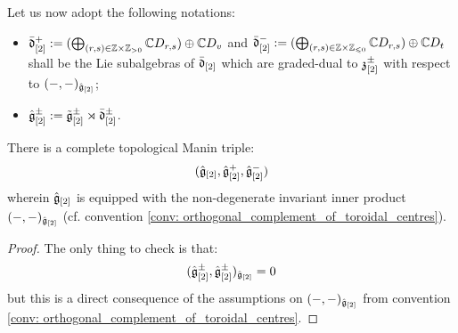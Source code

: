             \begin{convention}
                Let us now adopt the following notations:
                \begin{itemize}
                    \item $\bar{\d}_{[2]}^+ := ( \bigoplus_{(r, s) \in \Z \x \Z_{> 0} } \bbC D_{r, s} ) \oplus \bbC D_v$ and $\bar{\d}_{[2]}^- := ( \bigoplus_{(r, s) \in \Z \x \Z_{\leq 0} } \bbC D_{r, s} ) \oplus \bbC D_t$ shall be the Lie subalgebras of $\bar{\mathfrak{d}}_{[2]}$ which are graded-dual to $\mathfrak{z}_{[2]}^{\pm}$ with respect to $(-, -)_{\hat{\mathfrak{g}}_{[2]}}$;
                    \item $\hat{\mathfrak{g}}_{[2]}^{\pm} := \tilde{\mathfrak{g}}_{[2]}^{\pm} \rtimes \bar{\mathfrak{d}}_{[2]}^{\pm}$.
                \end{itemize}
            \end{convention}    
            \begin{theorem} \label{theorem: extended_toroidal_manin_triples}
                There is a complete topological Manin triple:
                    $$(\hat{\mathfrak{g}}_{[2]}, \hat{\mathfrak{g}}_{[2]}^+, \hat{\mathfrak{g}}_{[2]}^-)$$
                wherein $\hat{\mathfrak{g}}_{[2]}$ is equipped with the non-degenerate invariant inner product $(-, -)_{\hat{\mathfrak{g}}_{[2]}}$ (cf. convention \ref{conv: orthogonal_complement_of_toroidal_centres}).
            \end{theorem}
                \begin{proof}
                    The only thing to check is that:
                        $$(\hat{\mathfrak{g}}_{[2]}^{\pm}, \hat{\mathfrak{g}}_{[2]}^{\pm})_{\hat{\mathfrak{g}}_{[2]}} = 0$$
                    but this is a direct consequence of the assumptions on $(-, -)_{\hat{\mathfrak{g}}_{[2]}}$ from convention \ref{conv: orthogonal_complement_of_toroidal_centres}. 
                \end{proof}
